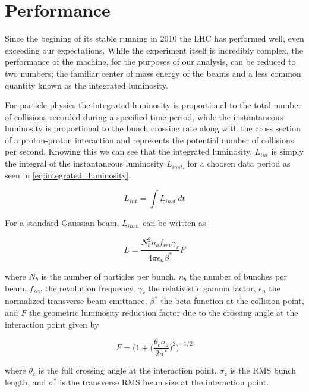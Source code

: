 \section{Performance} \label{sec:lhc:performance}

Since the begining of its stable running in 2010 the LHC has performed well,
even exceeding our expectations.  While the experiment itself is incredibly
complex, the performance of the machine, for the purposes of our analysis, can
be reduced to two numbers; the familiar center of mass energy of the beams and a
less common quantity known as the integrated luminosity.  

For particle physics the integrated luminosity is proportional to the total
number of collisions recorded during a specified time period, while the
instantaneous luminosity is proportional to the bunch crossing rate along with
the cross section of a proton-proton interaction and represents the potential
number of collisions per second.  Knowing this we can see that the integrated
luminosity, $L_{int}$ is simply the integral of the instantaneous luminosity
$L_{inst.}$ for a choosen data period as seen in
\cref{eq:integrated_luminosity}.

\begin{equation} \label{eq:integrated_luminosity}
   L_{int} = \int L_{inst.}dt 
\end{equation}

For a standard Gaussian beam, $L_{inst.}$ can be written as

\begin{equation}
  L = \frac{N_{b}^{2}n_{b}f_{rev}\gamma_{r}}{4\pi\epsilon_{n}\beta^{*}}F
\end{equation}

where $N_{b}$ is the number of particles per bunch, $n_{b}$ the number of
bunches per beam, $f_{rev}$ the revolution frequency, $\gamma_{r}$ the
relativistic gamma factor, $\epsilon_{n}$ the normalized transverse beam
emittance, $\beta^{*}$ the beta function at the collision point, and $F$ the
geometric luminosity reduction factor due to the crossing angle at the
interaction point given by

\begin{equation}
  F = \bigg(1 + \Big( \frac{\theta_{c}\sigma_{z}}{2\sigma^{*}} \Big) ^{2}
\bigg)^{-1/2} 
\end{equation}

where $\theta_{c}$ is the full crossing angle at the interaction point,
$\sigma_{z}$ is the RMS bunch length, and $\sigma^{*}$ is the transverse RMS
beam size at the interaction point.

